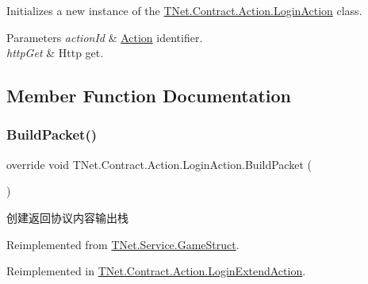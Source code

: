 Initializes a new instance of the \mbox{\hyperlink{class_t_net_1_1_contract_1_1_action_1_1_login_action}{T\+Net.\+Contract.\+Action.\+Login\+Action}} class. 


\begin{DoxyParams}{Parameters}
{\em action\+Id} & \mbox{\hyperlink{namespace_t_net_1_1_contract_1_1_action}{Action}} identifier.\\
\hline
{\em http\+Get} & Http get.\\
\hline
\end{DoxyParams}


\subsection{Member Function Documentation}
\mbox{\label{class_t_net_1_1_contract_1_1_action_1_1_login_action_abad56bdb3d581655eb0f5b7ea13f529e}} 
\subsubsection{\texorpdfstring{Build\+Packet()}{BuildPacket()}}
{\footnotesize\ttfamily override void T\+Net.\+Contract.\+Action.\+Login\+Action.\+Build\+Packet (\begin{DoxyParamCaption}{ }\end{DoxyParamCaption})\hspace{0.3cm}{\ttfamily [virtual]}}



创建返回协议内容输出栈 



Reimplemented from \mbox{\hyperlink{class_t_net_1_1_service_1_1_game_struct_a07c2501acfc1957399e45b1c3539bc70}{T\+Net.\+Service.\+Game\+Struct}}.



Reimplemented in \mbox{\hyperlink{class_t_net_1_1_contract_1_1_action_1_1_login_extend_action_a44cd85d17ec24e8fa99317d243bb2aa2}{T\+Net.\+Contract.\+Action.\+Login\+Extend\+Action}}.

\mbox{\label{class_t_net_1_1_contract_1_1_action_1_1_login_action_ad91710333b360bfc9148f08228161467}} 

